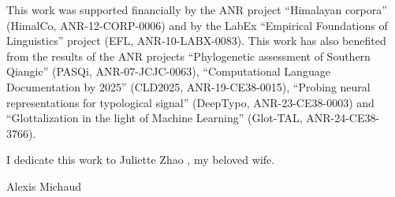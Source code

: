 This work was supported financially by the ANR project  “Himalayan corpora” (HimalCo, ANR-12-CORP-0006) and by the LabEx “Empirical Foundations of Linguistics” project (EFL, ANR-10-LABX-0083). This work has also benefited from the results of the ANR projects “Phylogenetic assessment of Southern Qiangic” (PASQi, ANR-07-JCJC-0063), “Computational Language Documentation by 2025” (CLD2025, ANR-19-CE38-0015), “Probing neural representations for typological signal” (DeepTypo, ANR-23-CE38-0003) and “Glottalization in the light of Machine Learning” (Glot-TAL, ANR-24-CE38-3766).

I dedicate this work to Juliette Zhao , my beloved wife.

{\raggedleft Alexis Michaud\par}
